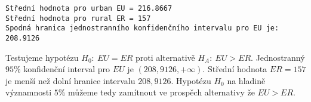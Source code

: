 \documentclass[11pt]{article}
\begin{document}
    \begin{Verbatim}[commandchars=\\\{\}]
Střední hodnota pro urban EU = 216.8667 
Střední hodnota pro rural ER = 157 
Spodná hranica jednostranního konfidenčního intervalu pro EU je:  208.9126 
    \end{Verbatim}

\noindent Testujeme hypotézu $H_0:\ EU = ER$ proti alternativě $H_A:\ EU > ER$. 
Jednostranný $95\%$ konfidenční interval pro $EU$ je $(208,9126,+\infty)$. 
Střední hodnota $ER = 157$ je menší než dolní hranice intervalu $208,9126$. 
Hypotézu $H_0$ na hladině významnosti $5\%$ můžeme tedy zamítnout ve prospěch alternativy že $EU > ER$.

    
    
    
    
\end{document}
